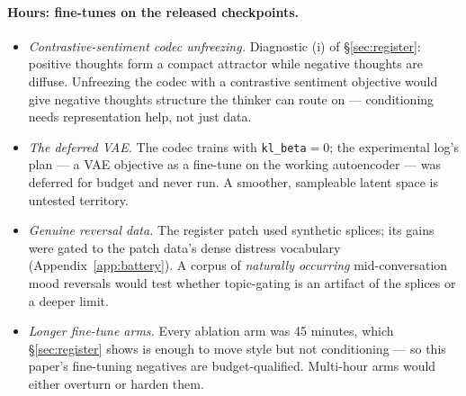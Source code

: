 \documentclass[11pt]{article}
\begin{document}
\paragraph{Hours: fine-tunes on the released checkpoints.}
\begin{itemize}
  \item \emph{Contrastive-sentiment codec unfreezing.} Diagnostic (i) of
    \S\ref{sec:register}: positive thoughts form a compact attractor while
    negative thoughts are diffuse. Unfreezing the codec with a contrastive
    sentiment objective would give negative thoughts structure the thinker
    can route on --- conditioning needs representation help, not just data.
  \item \emph{The deferred VAE.} The codec trains with
    \texttt{kl\_beta}${=}0$; the experimental log's plan --- a VAE objective
    as a fine-tune on the working autoencoder --- was deferred for budget
    and never run. A smoother, sampleable latent space is untested
    territory.
  \item \emph{Genuine reversal data.} The register patch used synthetic
    splices; its gains were gated to the patch data's dense distress
    vocabulary (Appendix~\ref{app:battery}). A corpus of \emph{naturally
    occurring} mid-conversation mood reversals would test whether
    topic-gating is an artifact of the splices or a deeper limit.
  \item \emph{Longer fine-tune arms.} Every ablation arm was 45 minutes,
    which \S\ref{sec:register} shows is enough to move style but not
    conditioning --- so this paper's fine-tuning negatives are
    budget-qualified. Multi-hour arms would either overturn or harden them.
\end{itemize}
\end{document}
